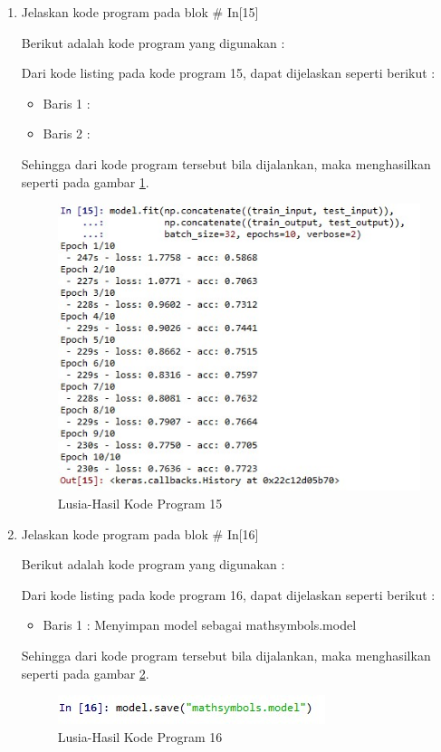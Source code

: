 \begin{enumerate}
\item Jelaskan kode program pada blok \# In[15]
\par Berikut adalah kode program yang digunakan :
	
	\par Dari kode listing pada kode program 15, dapat dijelaskan seperti berikut :
	\begin{itemize}
	\item Baris 1	: 
	\item Baris 2	: 
	\end{itemize}
	\par Sehingga dari kode program tersebut bila dijalankan, maka menghasilkan seperti pada gambar \ref{7B15}.
		\begin{figure}[!hbtp]
		\centering
		\includegraphics[scale=0.5]{figures/w15.jpg}
		\caption{Lusia-Hasil Kode Program 15}
		\label{7B15}
		\end{figure}

\item Jelaskan kode program pada blok \# In[16]
\par Berikut adalah kode program yang digunakan :
	
	\par Dari kode listing pada kode program 16, dapat dijelaskan seperti berikut :
	\begin{itemize}
	\item Baris 1	: Menyimpan model sebagai mathsymbols.model
	\end{itemize}
	\par Sehingga dari kode program tersebut bila dijalankan, maka menghasilkan seperti pada gambar \ref{7B16}.
		\begin{figure}[!hbtp]
		\centering
		\includegraphics[scale=0.5]{figures/w16.jpg}
		\caption{Lusia-Hasil Kode Program 16}
		\label{7B16}
		\end{figure}


\end{enumerate}
